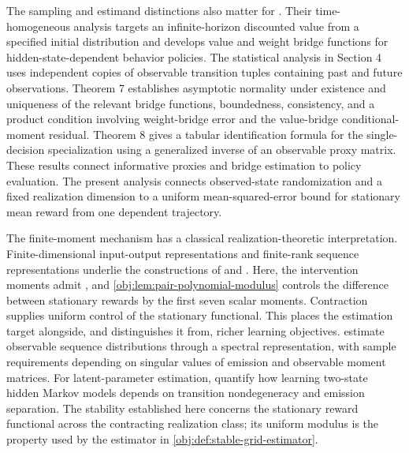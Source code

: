 \documentclass[11pt]{article}
\begin{document}
The sampling and estimand distinctions also matter for \citet[Section 4 and Theorems 7--8]{ShiUeharaHuangJiang2022}. Their time-homogeneous analysis targets an infinite-horizon discounted value from a specified initial distribution and develops value and weight bridge functions for hidden-state-dependent behavior policies. The statistical analysis in Section 4 uses independent copies of observable transition tuples containing past and future observations. Theorem 7 establishes asymptotic normality under existence and uniqueness of the relevant bridge functions, boundedness, consistency, and a product condition involving weight-bridge error and the value-bridge conditional-moment residual. Theorem 8 gives a tabular identification formula for the single-decision specialization using a generalized inverse of an observable proxy matrix. These results connect informative proxies and bridge estimation to policy evaluation. The present analysis connects observed-state randomization and a fixed realization dimension to a uniform mean-squared-error bound for stationary mean reward from one dependent trajectory.

The finite-moment mechanism has a classical realization-theoretic interpretation. Finite-dimensional input-output representations and finite-rank sequence representations underlie the constructions of \citet[pp.\ 545--548]{Ho1966} and \citet[pp.\ 26--40]{Carlyle1971}. Here, the intervention moments admit , and \cref{obj:lem:pair-polynomial-modulus} controls the difference between stationary rewards by the first seven scalar moments. Contraction supplies uniform control of the stationary functional. This places the estimation target alongside, and distinguishes it from, richer learning objectives. \citet[Condition 1 and Theorem 6]{HsuKakadeZhang2012} estimate observable sequence distributions through a spectral representation, with sample requirements depending on singular values of emission and observable moment matrices. For latent-parameter estimation, \citet[Theorem 1 and Corollary 1]{AbrahamGassiatNaulet2023} quantify how learning two-state hidden Markov models depends on transition nondegeneracy and emission separation. The stability established here concerns the stationary reward functional across the contracting realization class; its uniform modulus is the property used by the estimator in \cref{obj:def:stable-grid-estimator}.
\end{document}

